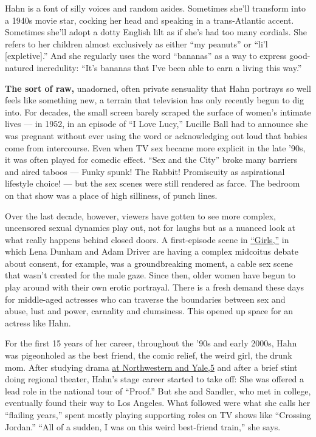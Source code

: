 Hahn is a font of silly voices and random asides. Sometimes she'll
transform into a 1940s movie star, cocking her head and speaking in a
trans-Atlantic accent. Sometimes she'll adopt a dotty English lilt as if
she's had too many cordials. She refers to her children almost
exclusively as either ``my peanuts'' or ``li'l {[}expletive{]}.'' And
she regularly uses the word ``bananas'' as a way to express good-natured
incredulity: ``It's bananas that I've been able to earn a living this
way.''

\textbf{The sort of raw,} unadorned, often private sensuality that Hahn
portrays so well feels like something new, a terrain that television has
only recently begun to dig into. For decades, the small screen barely
scraped the surface of women's intimate lives --- in 1952, in an episode
of ``I Love Lucy,'' Lucille Ball had to announce she was pregnant
without ever using the word or acknowledging out loud that babies come
from intercourse. Even when TV sex became more explicit in the late
'90s, it was often played for comedic effect. ``Sex and the City'' broke
many barriers and aired taboos --- Funky spunk! The Rabbit! Promiscuity
as aspirational lifestyle choice! --- but the sex scenes were still
rendered as farce. The bedroom on that show was a place of high
silliness, of punch lines.

Over the last decade, however, viewers have gotten to see more complex,
uncensored sexual dynamics play out, not for laughs but as a nuanced
look at what really happens behind closed doors. A first-episode scene
in
\href{https://www.nytimes3xbfgragh.onion/2017/02/02/arts/television/girls-season-six.html}{``Girls,''}
in which Lena Dunham and Adam Driver are having a complex midcoitus
debate about consent, for example, was a groundbreaking moment, a cable
sex scene that wasn't created for the male gaze. Since then, older women
have begun to play around with their own erotic portrayal. There is a
fresh demand these days for middle-aged actresses who can traverse the
boundaries between sex and abuse, lust and power, carnality and
clumsiness. This opened up space for an actress like Hahn.

For the first 15 years of her career, throughout the '90s and early
2000s, Hahn was pigeonholed as the best friend, the comic relief, the
weird girl, the drunk mom. After studying drama
\href{http://nytimes3xbfgragh.onion\#tooltip-5}{at Northwestern and
Yale,5} and after a brief stint doing regional theater, Hahn's stage
career started to take off: She was offered a lead role in the national
tour of ``Proof.'' But she and Sandler, who met in college, eventually
found their way to Los Angeles. What followed were what she calls her
``flailing years,'' spent mostly playing supporting roles on TV shows
like ``Crossing Jordan.'' ``All of a sudden, I was on this weird
best-friend train,'' she says.

